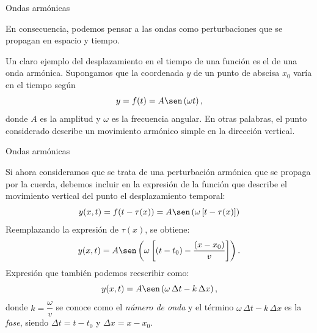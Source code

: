 \documentclass[11pt,handout,aspectratio=1610]{beamer}
\newcommand{\vs}{\vspace{11pt}}
\begin{document}
\begin{frame}{Ondas armónicas}

    En consecuencia, podemos pensar a las ondas como perturbaciones que se propagan en espacio y tiempo.

    \vs

    Un claro ejemplo del desplazamiento en el tiempo de una función es el de una onda armónica. Supongamos que la coordenada $y$ de un punto de abscisa $x_0$ varía en el tiempo según $$ y = f(t) = A \sen \left(\omega t\right), $$ donde $A$ es la amplitud y $\omega$ es la frecuencia angular. En otras palabras, el punto considerado describe un movimiento armónico simple en la dirección vertical.

    \begin{figure}
        \centering
    \end{figure}

    
\end{frame}

\begin{frame}{Ondas armónicas}

    Si ahora consideramos que se trata de una perturbación armónica que se propaga por la cuerda, debemos incluir en la expresión de la función que describe el movimiento vertical del punto el desplazamiento temporal: $$ y(x,t) = f(t-\tau(x)) = A \sen \left(\omega \left[t - \tau(x)\right]\right) $$ Reemplazando la expresión de $\tau (x)$, se obtiene: $$ y(x,t) = A \sen \left(\omega \left[\left(t - t_0\right) - \frac{\left(x-x_0\right)}{v}\right]\right). $$ Expresión que también podemos reescribir como: $$ y(x,t) = A \sen \left(\omega \, \Delta t - k \, \Delta x\right), $$ donde $k = \dfrac{\omega}{v}$ se conoce como el \emph{número de onda} y el término $\omega \, \Delta t - k \, \Delta x $ es la \emph{fase}, siendo $\Delta t = t - t_0$ y $\Delta x = x - x_0$.

        
\end{frame}
\end{document}
